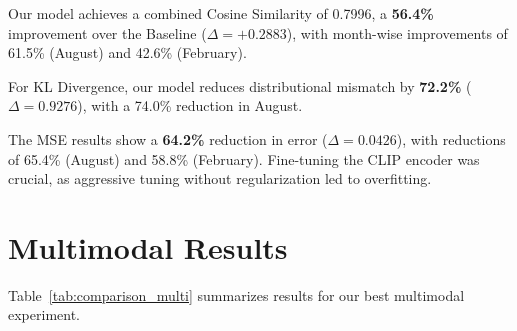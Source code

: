 \begin{table}[ht]
    \centering
    \caption{Performance comparison between Baseline and Our Model for image-based experiments. The Baseline model is \textbf{CLIP ViT-L/14}, applied without fine-tuning. Higher values are better for $\uparrow$, and lower values are better for $\downarrow$. Bold values indicate combined scores.}
    \label{tab:comparison_img}
\end{table}

Our model achieves a combined Cosine Similarity of 0.7996, a \textbf{56.4\%} improvement over the Baseline ($\Delta = +0.2883$), with month-wise improvements of 61.5\% (August) and 42.6\% (February).
\newline

For KL Divergence, our model reduces distributional mismatch by \textbf{72.2\%} ($\Delta = 0.9276$), with a 74.0\% reduction in August.
\newline

The MSE results show a \textbf{64.2\%} reduction in error ($\Delta = 0.0426$), with reductions of 65.4\% (August) and 58.8\% (February). Fine-tuning the CLIP encoder was crucial, as aggressive tuning without regularization led to overfitting.

\section{Multimodal Results}
\label{sec:multimodal-results}

Table~\ref{tab:comparison_multi} summarizes results for our best multimodal experiment.

